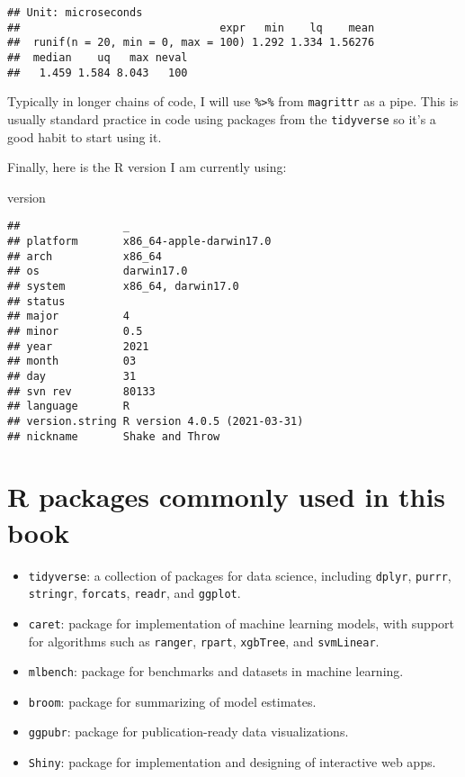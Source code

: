 \documentclass[
]{book}
\newenvironment{Shaded}{\begin{snugshade}}{\end{snugshade}}
\newcommand{\NormalTok}[1]{#1}
\begin{document}
\begin{verbatim}
## Unit: microseconds
##                               expr   min    lq    mean
##  runif(n = 20, min = 0, max = 100) 1.292 1.334 1.56276
##  median    uq   max neval
##   1.459 1.584 8.043   100
\end{verbatim}

Typically in longer chains of code, I will use \texttt{\%\textgreater{}\%} from \texttt{magrittr} as a pipe. This is usually standard practice in code using packages from the \texttt{tidyverse} so it's a good habit to start using it.

Finally, here is the R version I am currently using:

\begin{Shaded}
\begin{Highlighting}[]
\NormalTok{version}
\end{Highlighting}
\end{Shaded}

\begin{verbatim}
##                _                           
## platform       x86_64-apple-darwin17.0     
## arch           x86_64                      
## os             darwin17.0                  
## system         x86_64, darwin17.0          
## status                                     
## major          4                           
## minor          0.5                         
## year           2021                        
## month          03                          
## day            31                          
## svn rev        80133                       
## language       R                           
## version.string R version 4.0.5 (2021-03-31)
## nickname       Shake and Throw
\end{verbatim}

\hypertarget{r-packages-commonly-used-in-this-book}{%
\section{R packages commonly used in this book}\label{r-packages-commonly-used-in-this-book}}

\begin{itemize}
\item
  \texttt{tidyverse}: a collection of packages for data science, including \texttt{dplyr}, \texttt{purrr}, \texttt{stringr}, \texttt{forcats}, \texttt{readr}, and \texttt{ggplot}.
\item
  \texttt{caret}: package for implementation of machine learning models, with support for algorithms such as \texttt{ranger}, \texttt{rpart}, \texttt{xgbTree}, and \texttt{svmLinear}.
\item
  \texttt{mlbench}: package for benchmarks and datasets in machine learning.
\item
  \texttt{broom}: package for summarizing of model estimates.
\item
  \texttt{ggpubr}: package for publication-ready data visualizations.
\item
  \texttt{Shiny}: package for implementation and designing of interactive web apps.
\end{itemize}
\end{document}
